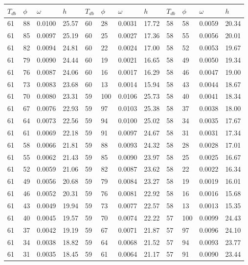 \begin{tabular}{llll|llll|llll}
 \toprule 
\(T_{db}\) & \(\phi\) & \(\omega\) & \(h\) & \(T_{db}\) & \(\phi\) & \(\omega\) & \(h\) & \(T_{db}\) & \(\phi\) & \(\omega\) & \(h\)  \\ \midrule 
61 & 88 & 0.0100 & 25.57 & 60 & 28 & 0.0031 & 17.72 & 58 & 58 & 0.0059 & 20.34\\
61 & 85 & 0.0097 & 25.19 & 60 & 25 & 0.0027 & 17.36 & 58 & 55 & 0.0056 & 20.01\\
61 & 82 & 0.0094 & 24.81 & 60 & 22 & 0.0024 & 17.00 & 58 & 52 & 0.0053 & 19.67\\
61 & 79 & 0.0090 & 24.44 & 60 & 19 & 0.0021 & 16.65 & 58 & 49 & 0.0050 & 19.34\\
61 & 76 & 0.0087 & 24.06 & 60 & 16 & 0.0017 & 16.29 & 58 & 46 & 0.0047 & 19.00\\
61 & 73 & 0.0083 & 23.68 & 60 & 13 & 0.0014 & 15.94 & 58 & 43 & 0.0044 & 18.67\\
61 & 70 & 0.0080 & 23.31 & 59 & 100 & 0.0106 & 25.73 & 58 & 40 & 0.0041 & 18.34\\
61 & 67 & 0.0076 & 22.93 & 59 & 97 & 0.0103 & 25.38 & 58 & 37 & 0.0038 & 18.00\\
61 & 64 & 0.0073 & 22.56 & 59 & 94 & 0.0100 & 25.02 & 58 & 34 & 0.0035 & 17.67\\
61 & 61 & 0.0069 & 22.18 & 59 & 91 & 0.0097 & 24.67 & 58 & 31 & 0.0031 & 17.34\\
61 & 58 & 0.0066 & 21.81 & 59 & 88 & 0.0093 & 24.32 & 58 & 28 & 0.0028 & 17.01\\
61 & 55 & 0.0062 & 21.43 & 59 & 85 & 0.0090 & 23.97 & 58 & 25 & 0.0025 & 16.67\\
61 & 52 & 0.0059 & 21.06 & 59 & 82 & 0.0087 & 23.62 & 58 & 22 & 0.0022 & 16.34\\
61 & 49 & 0.0056 & 20.68 & 59 & 79 & 0.0084 & 23.27 & 58 & 19 & 0.0019 & 16.01\\
61 & 46 & 0.0052 & 20.31 & 59 & 76 & 0.0081 & 22.92 & 58 & 16 & 0.0016 & 15.68\\
61 & 43 & 0.0049 & 19.94 & 59 & 73 & 0.0077 & 22.57 & 58 & 13 & 0.0013 & 15.35\\
61 & 40 & 0.0045 & 19.57 & 59 & 70 & 0.0074 & 22.22 & 57 & 100 & 0.0099 & 24.43\\
61 & 37 & 0.0042 & 19.19 & 59 & 67 & 0.0071 & 21.87 & 57 & 97 & 0.0096 & 24.10\\
61 & 34 & 0.0038 & 18.82 & 59 & 64 & 0.0068 & 21.52 & 57 & 94 & 0.0093 & 23.77\\
61 & 31 & 0.0035 & 18.45 & 59 & 61 & 0.0064 & 21.17 & 57 & 91 & 0.0090 & 23.44\\

\end{tabular}
